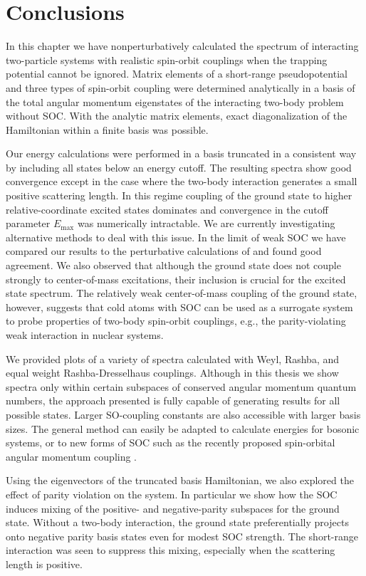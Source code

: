 \section{Conclusions}

In this chapter we have nonperturbatively calculated the spectrum of interacting two-particle systems with realistic spin-orbit couplings when the trapping potential cannot be ignored.  Matrix elements of a short-range pseudopotential and three types of spin-orbit coupling were determined analytically in a basis of the total angular momentum eigenstates of the interacting two-body problem without SOC. With the analytic matrix elements, exact diagonalization of the Hamiltonian within a finite basis was possible.

Our energy calculations were performed in a basis truncated in a consistent way by including all states below an energy cutoff. The resulting spectra show good convergence except in the case where the two-body interaction generates a small positive scattering length. In this regime coupling of the ground state to higher relative-coordinate excited states dominates and convergence in the cutoff parameter $E_{\text{max}}$ was numerically intractable. We are currently investigating alternative methods to deal with this issue. In the limit of weak SOC we have compared our results to the perturbative calculations of \cite{PhysRevA.89.033606} and found good agreement. We also observed that although the ground state does not couple strongly to center-of-mass excitations, their inclusion is crucial for the excited state spectrum.  The relatively weak center-of-mass coupling of the ground state, however, suggests that cold atoms with SOC can be used as a surrogate system to probe properties of two-body spin-orbit couplings, e.g., the parity-violating weak interaction in nuclear systems. 

We provided plots of a variety of spectra calculated with Weyl, Rashba, and equal weight Rashba-Dresselhaus couplings.  Although in this thesis we show spectra only within certain subspaces of conserved angular momentum quantum numbers, the approach presented is fully capable of generating results for all possible states. Larger SO-coupling constants are also accessible with larger basis sizes. The general method can easily be adapted to calculate energies for bosonic systems, or to new forms of SOC such as the recently proposed spin-orbital angular momentum coupling \cite{2014arXiv1411.1737S}.  

Using the eigenvectors of the truncated basis Hamiltonian, we also explored the effect of parity violation on the system. In particular we show how the SOC induces mixing of the positive- and negative-parity subspaces for the ground state. Without a two-body interaction, the ground state preferentially projects onto negative parity basis states even for modest SOC strength. The short-range interaction was seen to suppress this mixing, especially when the scattering length is positive.

